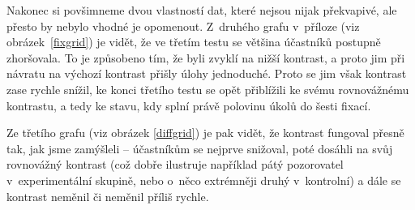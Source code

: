 Nakonec si povšimneme dvou vlastností dat, které nejsou nijak překvapivé, ale
přesto by nebylo vhodné je opomenout. Z~druhého grafu v~příloze (viz obrázek~\ref{fixgrid}) je vidět, že ve třetím testu se většina účastníků postupně
zhoršovala. To je způsobeno tím, že byli zvyklí na nižší kontrast, a proto jim
při návratu na výchozí kontrast přišly úlohy jednoduché. Proto se jim však
kontrast zase rychle snížil, ke konci třetího testu se opět přiblížili ke svému
rovnovážnému kontrastu, a tedy ke stavu, kdy splní právě polovinu úkolů do šesti
fixací.

Ze třetího grafu (viz obrázek \ref{diffgrid}) je pak vidět, že kontrast
fungoval přesně tak, jak jsme zamýšleli -- účastníkům se nejprve snižoval, poté
dosáhli na svůj rovnovážný kontrast (což dobře ilustruje například pátý
pozorovatel v~experimentální skupině, nebo o~něco extrémněji druhý v~kontrolní)
a dále se kontrast neměnil či neměnil příliš rychle. 
